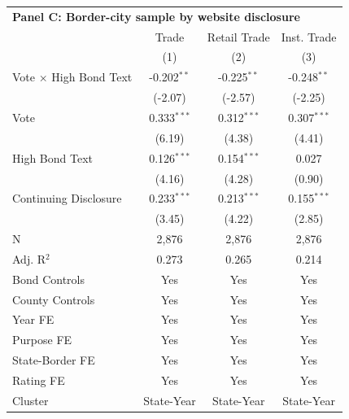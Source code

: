 \begingroup
\centering
\begin{tabular*}{\textwidth}{@{\extracolsep{\fill}}lccc}
\multicolumn{5}{l}{\textbf{Panel C: Border-city sample by website disclosure}}\\

\addlinespace
   \toprule
                                 & Trade         & Retail Trade  & Inst. Trade\\  
                                 & (1)           & (2)           & (3)\\  
   \midrule 
   Vote $\times$ High Bond Text  & -0.202$^{**}$ & -0.225$^{**}$ & -0.248$^{**}$\\   
                                 & (-2.07)      & (-2.57)      & (-2.25)\\   
   Vote                          & 0.333$^{***}$ & 0.312$^{***}$ & 0.307$^{***}$\\   
                                 & (6.19)       & (4.38)       & (4.41)\\   
   High Bond Text                & 0.126$^{***}$ & 0.154$^{***}$ & 0.027\\   
                                 & (4.16)       & (4.28)       & (0.90)\\   
   Continuing Disclosure         & 0.233$^{***}$ & 0.213$^{***}$ & 0.155$^{***}$\\   
                                 & (3.45)       & (4.22)       & (2.85)\\   
   \hline
   N                  & 2,876         & 2,876         & 2,876\\  
   Adj. R$^2$                & 0.273         & 0.265         & 0.214\\  
   Bond Controls                 & Yes           & Yes           & Yes\\  
   County Controls               & Yes           & Yes           & Yes\\  
   Year FE                       & Yes           & Yes           & Yes\\  
   Purpose FE                    & Yes           & Yes           & Yes\\  
   State-Border FE               & Yes           & Yes           & Yes\\  
   Rating FE                     & Yes           & Yes           & Yes\\  
   Cluster              & State-Year & State-Year & State-Year\\  
   \bottomrule
\end{tabular*}
\par\endgroup
